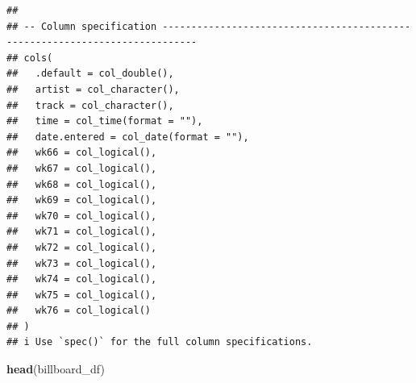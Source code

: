 \documentclass[
]{article}
\newenvironment{Shaded}{\begin{snugshade}}{\end{snugshade}}
\newcommand{\KeywordTok}[1]{\textcolor[rgb]{0.13,0.29,0.53}{\textbf{#1}}}
\newcommand{\NormalTok}[1]{#1}
\begin{document}
\begin{verbatim}
## 
## -- Column specification ----------------------------------------------------------------------------
## cols(
##   .default = col_double(),
##   artist = col_character(),
##   track = col_character(),
##   time = col_time(format = ""),
##   date.entered = col_date(format = ""),
##   wk66 = col_logical(),
##   wk67 = col_logical(),
##   wk68 = col_logical(),
##   wk69 = col_logical(),
##   wk70 = col_logical(),
##   wk71 = col_logical(),
##   wk72 = col_logical(),
##   wk73 = col_logical(),
##   wk74 = col_logical(),
##   wk75 = col_logical(),
##   wk76 = col_logical()
## )
## i Use `spec()` for the full column specifications.
\end{verbatim}

\begin{Shaded}
\begin{Highlighting}[]
\KeywordTok{head}\NormalTok{(billboard\_df)}
\end{Highlighting}
\end{Shaded}
\end{document}
